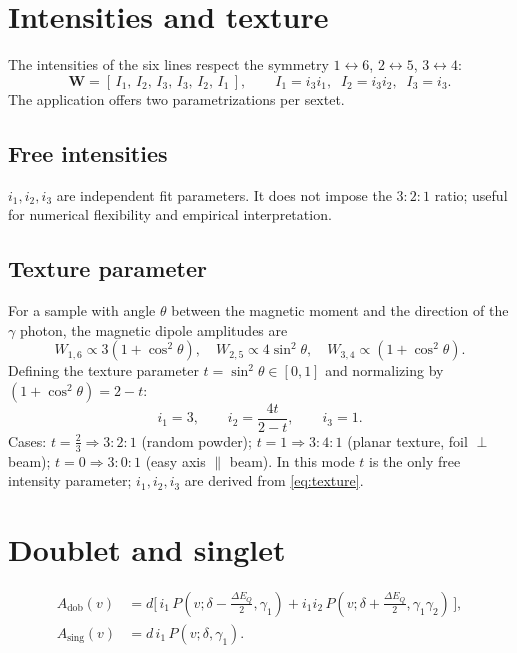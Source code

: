 \documentclass[11pt,a4paper]{article}
\newcommand{\dEQ}{\Delta E_{Q}}
\begin{document}
\section{Intensities and texture}\label{sec:intensities}

The intensities of the six lines respect the symmetry $1\!\leftrightarrow\!6$,
$2\!\leftrightarrow\!5$, $3\!\leftrightarrow\!4$:
\begin{equation}
  \bm W = [\,I_1,\,I_2,\,I_3,\,I_3,\,I_2,\,I_1\,],\qquad
  I_1=i_3 i_1,\;\; I_2=i_3 i_2,\;\; I_3=i_3.
\end{equation}
The application offers two parametrizations per sextet.

\subsection{Free intensities}
$i_1,i_2,i_3$ are independent fit parameters. It does not impose the
$3{:}2{:}1$ ratio; useful for numerical flexibility and empirical interpretation.

\subsection{Texture parameter}\label{sec:texture}
For a sample with angle $\theta$ between the magnetic moment and the direction of the
$\gamma$ photon, the magnetic dipole amplitudes are
\begin{equation}
  W_{1,6}\propto 3(1+\cos^2\theta),\quad W_{2,5}\propto 4\sin^2\theta,\quad W_{3,4}\propto (1+\cos^2\theta).
\end{equation}
Defining the texture parameter $t=\sin^2\theta\in[0,1]$ and normalizing by
$(1+\cos^2\theta)=2-t$:
\begin{equation}
  \boxed{\;i_1 = 3,\qquad i_2 = \frac{4t}{2-t},\qquad i_3 = 1.\;}
  \label{eq:texture}
\end{equation}
Cases: $t=\tfrac23\Rightarrow 3{:}2{:}1$ (random powder); $t=1\Rightarrow
3{:}4{:}1$ (planar texture, foil $\perp$ beam); $t=0\Rightarrow 3{:}0{:}1$ (easy
axis $\parallel$ beam). In this mode $t$ is the only free
intensity parameter; $i_1,i_2,i_3$ are derived from \eqref{eq:texture}.

\section{Doublet and singlet}

\begin{align}
  A_{\text{dob}}(v) &= d\bigl[\,i_1\,P(v;\delta-\tfrac{\dEQ}{2},\gamma_1) + i_1 i_2\,P(v;\delta+\tfrac{\dEQ}{2},\gamma_1\gamma_2)\,\bigr],\\
  A_{\text{sing}}(v) &= d\,i_1\,P(v;\delta,\gamma_1).
\end{align}
\end{document}
